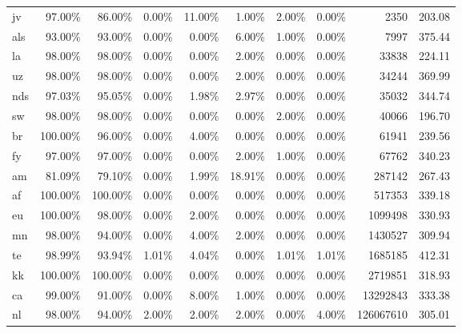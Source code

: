 \begin{table*}[hbt!]
{\begin{tabular}{l|rrrr|rrr|rr}
            jv           & 97.00\%  & 86.00\%  & 0.00\% & 11.00\% & 1.00\%   & 2.00\%   & 0.00\% & 2350         & 203.08     \\
            als          & 93.00\%  & 93.00\%  & 0.00\% & 0.00\%  & 6.00\%   & 1.00\%   & 0.00\% & 7997         & 375.44     \\
            la           & 98.00\%  & 98.00\%  & 0.00\% & 0.00\%  & 2.00\%   & 0.00\%   & 0.00\% & 33838        & 224.11     \\
            uz           & 98.00\%  & 98.00\%  & 0.00\% & 0.00\%  & 2.00\%   & 0.00\%   & 0.00\% & 34244        & 369.99     \\
            nds          & 97.03\%  & 95.05\%  & 0.00\% & 1.98\%  & 2.97\%   & 0.00\%   & 0.00\% & 35032        & 344.74     \\
            sw           & 98.00\%  & 98.00\%  & 0.00\% & 0.00\%  & 0.00\%   & 2.00\%   & 0.00\% & 40066        & 196.70     \\
            br           & 100.00\% & 96.00\%  & 0.00\% & 4.00\%  & 0.00\%   & 0.00\%   & 0.00\% & 61941        & 239.56     \\
            fy           & 97.00\%  & 97.00\%  & 0.00\% & 0.00\%  & 2.00\%   & 1.00\%   & 0.00\% & 67762        & 340.23     \\
            am           & 81.09\%  & 79.10\%  & 0.00\% & 1.99\%  & 18.91\%  & 0.00\%   & 0.00\% & 287142       & 267.43     \\
            af           & 100.00\% & 100.00\% & 0.00\% & 0.00\%  & 0.00\%   & 0.00\%   & 0.00\% & 517353       & 339.18     \\
            eu           & 100.00\% & 98.00\%  & 0.00\% & 2.00\%  & 0.00\%   & 0.00\%   & 0.00\% & 1099498      & 330.93     \\
            mn           & 98.00\%  & 94.00\%  & 0.00\% & 4.00\%  & 2.00\%   & 0.00\%   & 0.00\% & 1430527      & 309.94     \\
            te           & 98.99\%  & 93.94\%  & 1.01\% & 4.04\%  & 0.00\%   & 1.01\%   & 1.01\% & 1685185      & 412.31     \\
            kk           & 100.00\% & 100.00\% & 0.00\% & 0.00\%  & 0.00\%   & 0.00\%   & 0.00\% & 2719851      & 318.93     \\
            ca           & 99.00\%  & 91.00\%  & 0.00\% & 8.00\%  & 1.00\%   & 0.00\%   & 0.00\% & 13292843     & 333.38     \\
            nl           & 98.00\%  & 94.00\%  & 2.00\% & 2.00\%  & 2.00\%   & 0.00\%   & 4.00\% & 126067610    & 305.01     \\

\end{tabular}}
\end{table*}
